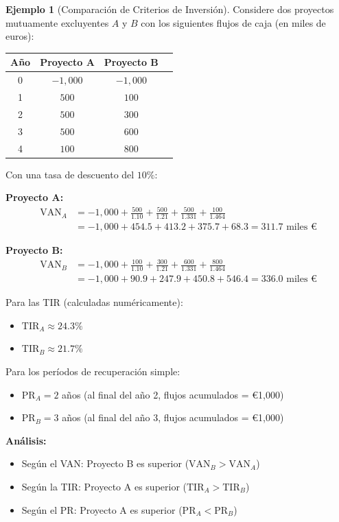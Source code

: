 \documentclass[12pt,a4paper]{article}
\theoremstyle{definition}
\newtheorem{ejemplo}{Ejemplo}[section]
\begin{document}
\begin{ejemplo}[Comparación de Criterios de Inversión]
Considere dos proyectos mutuamente excluyentes $A$ y $B$ con los siguientes flujos de caja (en miles de euros):

\begin{center}
\begin{tabular}{cccc}
\toprule
Año & Proyecto A & Proyecto B \\
\midrule
0 & $-1{,}000$ & $-1{,}000$ \\
1 & $500$ & $100$ \\
2 & $500$ & $300$ \\
3 & $500$ & $600$ \\
4 & $100$ & $800$ \\
\bottomrule
\end{tabular}
\end{center}

Con una tasa de descuento del $10\%$:

\textbf{Proyecto A:}
\begin{align*}
\text{VAN}_A &= -1{,}000 + \frac{500}{1.10} + \frac{500}{1.21} + \frac{500}{1.331} + \frac{100}{1.464} \\
&= -1{,}000 + 454.5 + 413.2 + 375.7 + 68.3 = 311.7 \text{ miles €}
\end{align*}

\textbf{Proyecto B:}
\begin{align*}
\text{VAN}_B &= -1{,}000 + \frac{100}{1.10} + \frac{300}{1.21} + \frac{600}{1.331} + \frac{800}{1.464} \\
&= -1{,}000 + 90.9 + 247.9 + 450.8 + 546.4 = 336.0 \text{ miles €}
\end{align*}

Para las TIR (calculadas numéricamente):
\begin{itemize}
\item $\text{TIR}_A \approx 24.3\%$
\item $\text{TIR}_B \approx 21.7\%$
\end{itemize}

Para los períodos de recuperación simple:
\begin{itemize}
\item $\text{PR}_A = 2$ años (al final del año 2, flujos acumulados = €1,000)
\item $\text{PR}_B = 3$ años (al final del año 3, flujos acumulados = €1,000)
\end{itemize}

\textbf{Análisis:}
\begin{itemize}
\item Según el VAN: Proyecto B es superior ($\text{VAN}_B > \text{VAN}_A$)
\item Según la TIR: Proyecto A es superior ($\text{TIR}_A > \text{TIR}_B$)
\item Según el PR: Proyecto A es superior ($\text{PR}_A < \text{PR}_B$)
\end{itemize}


\end{ejemplo}
\end{document}
